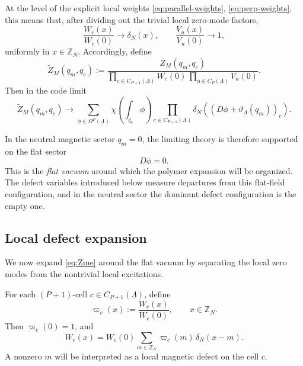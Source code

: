 \documentclass[dvipsnames,a4paper]{article}
\numberwithin{equation}{section}
\theoremstyle{definition}
\theoremstyle{remark}
\begin{document}
At the level of the explicit local weights \eqref{eq:parallel-weights}, \eqref{eq:perp-weights},
this means that, after dividing out the trivial local zero-mode factors,
\begin{equation}
	\frac{W_c(x)}{W_c(0)}\rightarrow \delta_N(x),
	\qquad
	\frac{V_u(x)}{V_u(0)}\rightarrow 1,
	\label{eq:codeLimitWV}
\end{equation}
uniformly in \(x\in\mathbb Z_N\). Accordingly, define
\begin{equation}
	\widetilde Z_M(q_m,q_e)
	:=
	\frac{Z_M(q_m,q_e)}
	{\prod_{c\in C_{P+1}(\underline\Lambda)}W_c(0)\,
		\prod_{u\in C_P(\underline\Lambda)}V_u(0)}.
	\label{eq:ZmeNormal}
\end{equation}
Then in the code limit
\begin{equation}
	\widetilde Z_M(q_m,q_e)
	\rightarrow
	\sum_{\phi\in \Omega^P(\underline\Lambda)}
	\chi \left(\int_{q_e}\phi\right)
	\prod_{c\in C_{P+1}(\underline\Lambda)}
	\delta_N \left((D\phi+\vartheta_{\underline\Lambda}(q_m))_c\right).
	\label{eq:codeLimitZme}
\end{equation}

In the neutral magnetic sector \(q_m=0\), the limiting theory is therefore supported on the
flat sector
\begin{equation}
	D\phi=0.
\end{equation}
This is the \emph{flat vacuum} around which the polymer expansion will be organized. The defect variables
introduced below measure departures from this flat-field configuration, and in the neutral
sector the dominant defect configuration is the empty one.

\subsection{Local defect expansion}

We now expand \eqref{eq:Zme} around the flat vacuum by separating the
local zero modes from the nontrivial local excitations.

For each \((P+1)\)-cell \(c\in C_{P+1}(\underline\Lambda)\), define
\begin{equation}
	\varpi_c(x)
	:=
	\frac{W_c(x)}{W_c(0)},
	\qquad
	x\in \mathbb Z_N.
	\label{eq:magnetic-local-amplitude}
\end{equation}
Then \(\varpi_c(0)=1\), and
\begin{equation}
	W_c(x)
	=
	W_c(0)\sum_{m\in \mathbb Z_N}\varpi_c(m)\,\delta_N(x-m).
	\label{eq:W-cell-expansion}
\end{equation}
A nonzero \(m\) will be interpreted as a local magnetic defect on the cell \(c\).
\end{document}

